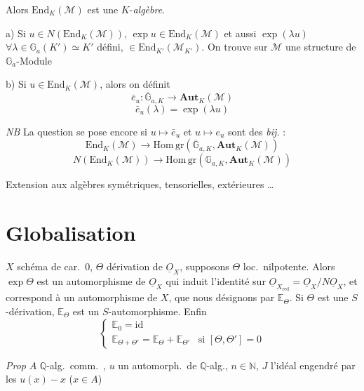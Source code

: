 \documentclass[11pt,a4paper]{article}
\begin{document}
Alors $\mathrm{End}_K(\mathcal{M})$ est une $K$-\emph{algèbre}.

a) Si $u \in N(\mathrm{End}_K(\mathcal{M}))$, $\exp u \in
\mathrm{End}_K(\mathcal{M})$ et aussi $\exp(\lambda u)$
$\forall \lambda \in \mathbb{G}_a(K') \simeq K'$ défini,
$\in \mathrm{End}_{K'}(\mathcal{M}_{K'})$. On trouve sur $\mathcal{M}$ une
structure de $\mathbb{G}_a$-Module \ill{}

b) Si $u \in \mathrm{End}_K(\mathcal{M})$, alors on définit
\[
\bar e_u : \overline{\mathbb{G}}_{a,K} \to \mathbf{Aut}_K(\mathcal{M})
\]
\[
\bar e_u(\lambda) = \exp(\lambda u)
\]

\emph{NB} La question se pose encore si $u \mapsto \bar e_u$ et
$u \mapsto e_u$ sont des \emph{bij.} :
\[
\mathrm{End}_K(\mathcal{M}) \to \mathrm{Hom\,gr}(\overline{\mathbb{G}}_{a,K}, \mathbf{Aut}_K(\mathcal{M}))
\]
\[
N(\mathrm{End}_K(\mathcal{M})) \to \mathrm{Hom\,gr}(\mathbb{G}_{a,K}, \mathbf{Aut}_K(\mathcal{M}))
\]

Extension aux \struck{\ill{}} algèbres symétriques, tensorielles,
extérieures …

\section*{Globalisation}

 $X$ schéma de car.\ 0, $\Theta$  dérivation de
$\underline{O}_X$, supposons $\Theta$ loc.\ nilpotente. Alors $\exp \Theta$ est
un automorphisme de $\underline{O}_X$ qui induit l'identité sur
$\underline{O}_{X_{\mathrm{red}}} = \underline{O}_X / N\underline{O}_X$, et
correspond à un automorphisme de $X$, que nous désignons par
$\mathbb{E}_\Theta$. Si $\Theta$ est une $S$-dérivation, $\mathbb{E}_\Theta$
est un $S$-automorphisme. Enfin
\[
\begin{cases}
\mathbb{E}_0 = \mathrm{id} \\
\mathbb{E}_{\Theta + \Theta'} = \mathbb{E}_\Theta + \mathbb{E}_{\Theta'} & \text{si } [\Theta, \Theta'] = 0
\end{cases}
\]

\emph{Prop} $A$ $\mathbb{Q}$-alg.\ comm.\ ,
$u$ un automorph.\ de $\mathbb{Q}$-alg., $n \in \mathbb{N}$, $J$ l'idéal
engendré par les $u(x) - x$ ($x \in A$)
\end{document}
